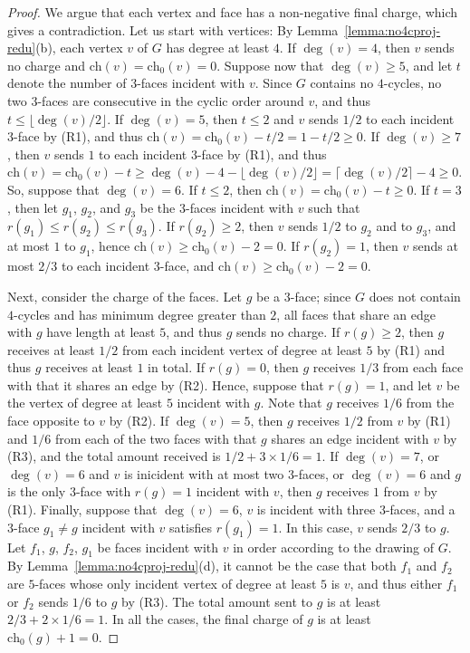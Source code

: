 \documentclass[12pt,twoside,openright,a4paper]{book}
\newcommand{\initch}{\text{ch}_0}
\newcommand{\finch}{\text{ch}}
\begin{document}
\begin{proof}
We argue that each vertex and face has a non-negative final charge,
which gives a contradiction.  Let us start with vertices: By Lemma~\ref{lemma:no4cproj-redu}(b),
each vertex $v$ of $G$ has degree at least $4$.  If $\deg(v)=4$, then $v$ sends no charge
and $\finch(v)=\initch(v)=0$.  Suppose now that $\deg(v)\ge 5$, and let $t$ denote the number
of $3$-faces incident with $v$.  Since $G$ contains no $4$-cycles, no two $3$-faces are consecutive
in the cyclic order around $v$, and thus $t\le \lfloor\deg(v)/2\rfloor$.
If $\deg(v)=5$, then $t\le 2$ and $v$ sends $1/2$ to each incident $3$-face by (R1), and thus
$\finch(v)=\initch(v)-t/2=1-t/2\ge 0$.  If $\deg(v)\ge 7$, then $v$ sends $1$ to each incident $3$-face by (R1),
and thus
$\finch(v)=\initch(v)-t\ge \deg(v)-4-\lfloor\deg(v)/2\rfloor=\lceil\deg(v)/2\rceil-4\ge 0$.
So, suppose that $\deg(v)=6$.  If $t\le2$, then $\finch(v)=\initch(v)-t\ge 0$.  If $t=3$, then let $g_1$, $g_2$, and $g_3$
be the $3$-faces incident with $v$ such that $r(g_1)\le r(g_2)\le r(g_3)$.  If $r(g_2)\ge 2$, then $v$ sends $1/2$ to $g_2$ and to $g_3$,
and at most $1$ to $g_1$, hence $\finch(v)\ge\initch(v)-2=0$.  If $r(g_2)=1$, then $v$ sends at most $2/3$ to each incident $3$-face,
and $\finch(v)\ge\initch(v)-2=0$.

Next, consider the charge of the faces.  Let $g$ be a $3$-face; since $G$ does not contain $4$-cycles
and has minimum degree greater than $2$, all faces that share an edge with $g$ have length at least $5$,
and thus $g$ sends no charge.  If $r(g)\ge 2$, then $g$ receives at least $1/2$ from each incident vertex of degree at least $5$ by (R1)
and thus $g$ receives at least $1$ in total.
If $r(g)=0$, then $g$ receives $1/3$ from each face with that it shares an edge by (R2).
Hence, suppose that $r(g)=1$, and let $v$ be the vertex of degree at least $5$ incident with $g$.  Note that
$g$ receives $1/6$ from the face opposite to $v$ by (R2).  If $\deg(v)=5$, then $g$ receives $1/2$ from $v$ by (R1)
and $1/6$ from each of the two faces with that $g$ shares an edge incident with $v$ by (R3), and the total amount received
is $1/2+3\times 1/6=1$.  If $\deg(v)=7$, or $\deg(v)=6$ and $v$ is inicident with at most two $3$-faces,
or $\deg(v)=6$ and $g$ is the only $3$-face with $r(g)=1$ incident with $v$, then $g$ receives $1$ from $v$ by (R1).
Finally, suppose that $\deg(v)=6$, $v$ is incident with three $3$-faces, and a $3$-face $g_1\neq g$ incident with $v$ satisfies $r(g_1)=1$.
In this case, $v$ sends $2/3$ to $g$.
Let $f_1$, $g$, $f_2$, $g_1$ be faces incident with $v$ in order according to the drawing of $G$.
By Lemma~\ref{lemma:no4cproj-redu}(d), it cannot be the case that both $f_1$ and $f_2$ are $5$-faces whose only incident vertex
of degree at least $5$ is $v$, and thus either $f_1$ or $f_2$ sends $1/6$ to $g$ by (R3).  The total amount sent to $g$
is at least $2/3+2\times 1/6=1$.
In all the cases, the final charge of $g$ is at least $\initch(g)+1=0$.


\end{proof}
\end{document}
